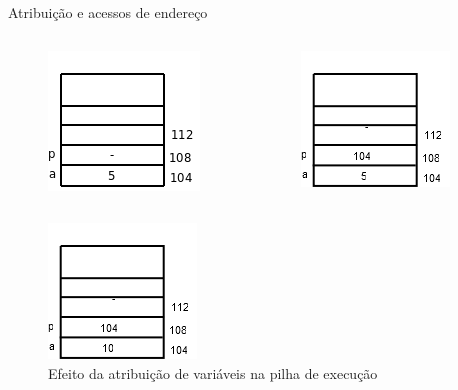 \begin{frame}[plain,c]{Atribuição e acessos de endereço}  
    \begin{columns}
    \column{5cm}
      \begin{figure}[ht]
        \centering
        \includegraphics[width=.6\textwidth]{figs/fig_ponteiros/memoria-atribuicao-a}
      \end{figure}
    \column{5cm}
        \begin{figure}[ht]
          \centering
          \includegraphics[width=.6\textwidth]{figs/fig_ponteiros/memoria-atribuicao-p}
        \end{figure} 
    \end{columns}
    \begin{figure}[ht]
          \centering
          \includegraphics[width=.4\textwidth]{figs/fig_ponteiros/memoria-atribuicao-pa}
          \caption{Efeito da atribuição de variáveis na pilha de execução}
    \end{figure}
\end{frame}

